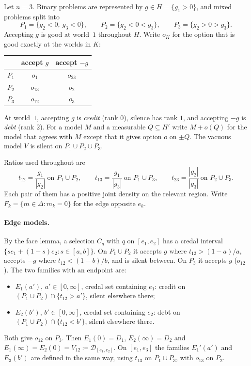 \documentclass[11pt]{article}
\theoremstyle{definition}\newtheorem{definition}[theorem]{Definition}
\theoremstyle{remark}\newtheorem{remark}[theorem]{Remark}
\newcommand{\Dscr}{\mathcal D}
\begin{document}
Let $n=3$. Binary problems are represented by $g\in H=\{g_1>0\}$, and mixed
problems split into
\[
 P_1=\{g_2<0,\ g_3<0\},\qquad P_2=\{g_2<0<g_3\},\qquad P_3=\{g_2>0>g_3\}.
\]
Accepting $g$ is good at world~$1$ throughout $H$. Write $o_K$ for the option
that is good exactly at the worlds in $K$:
\begin{center}
\begin{tabular}{c|c|c}
 & accept $g$ & accept $-g$\\\hline
$P_1$ & $o_1$ & $o_{23}$\\
$P_2$ & $o_{13}$ & $o_2$\\
$P_3$ & $o_{12}$ & $o_3$
\end{tabular}
\end{center}
At world~$1$, accepting $g$ is \emph{credit} (rank $0$), silence has rank $1$,
and accepting $-g$ is \emph{debt} (rank $2$). For a model $M$ and a
measurable $Q\subseteq H'$ write $M+o(Q)$ for the model that agrees with $M$
except that it gives option $o$ on $\pm Q$. The vacuous model $V$ is silent on
$P_1\cup P_2\cup P_3$.

Ratios used throughout are
\[
 t_{12}=\frac{g_1}{|g_2|}\ \text{on }P_1\cup P_2,\qquad
 t_{13}=\frac{g_1}{|g_3|}\ \text{on }P_1\cup P_3,\qquad
 t_{23}=\frac{|g_2|}{|g_3|}\ \text{on }P_2\cup P_3.
\]
Each pair of them has a positive joint density on the relevant region. Write
$F_k=\{m\in\Delta:m_k=0\}$ for the edge opposite $e_k$.

\paragraph{Edge models.} By the face lemma, a selection $C_q$ with $q$ on
$[e_1,e_2]$ has a credal interval $\{se_1+(1-s)e_2:s\in[a,b]\}$. On
$P_1\cup P_2$ it accepts $g$ where $t_{12}>(1-a)/a$, accepts $-g$ where
$t_{12}<(1-b)/b$, and is silent between. On $P_3$ it accepts $g$ ($o_{12}$).
The two families with an endpoint are:
\begin{itemize}[leftmargin=*,itemsep=1pt]
\item $E_1(a')$, $a'\in[0,\infty]$, credal set containing $e_1$: credit on
$(P_1\cup P_2)\cap\{t_{12}>a'\}$, silent elsewhere there;
\item $E_2(b')$, $b'\in[0,\infty]$, credal set containing $e_2$: debt on
$(P_1\cup P_2)\cap\{t_{12}<b'\}$, silent elsewhere there.
\end{itemize}
Both give $o_{12}$ on $P_3$. Then $E_1(0)=D_1$, $E_2(\infty)=D_2$ and
$E_1(\infty)=E_2(0)=V_{12}\coloneqq\Dscr_{[e_1,e_2]}$. On $[e_1,e_3]$ the
families $E_1'(a')$ and $E_3(b')$ are defined in the same way, using $t_{13}$
on $P_1\cup P_3$, with $o_{13}$ on $P_2$.
\end{document}
